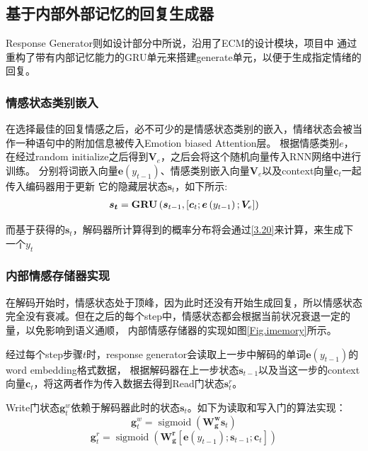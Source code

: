 \documentclass[supercite]{HustGraduPaper}
\theoremstyle{definition}
\begin{document}
\subsection{基于内部外部记忆的回复生成器}
Response Generator则如设计部分中所说，沿用了ECM\cite{DBLP:journals/corr/ZhouHZZL17}的设计模块，项目中
通过重构了带有内部记忆能力的GRU单元来搭建generate单元，以便于生成指定情绪的回复。

\subsubsection{情感状态类别嵌入}
在选择最佳的回复情感之后，必不可少的是情感状态类别的嵌入，情绪状态会被当作一种语句中的附加信息被传入Emotion biased Attention层。
根据情感类别$e$，在经过random initialize之后得到$\boldsymbol{V}_e$，之后会将这个随机向量传入RNN网络中进行训练。
分别将词嵌入向量$\boldsymbol{e}(y_{t-1})$、情感类别嵌入向量$\boldsymbol{V}_e$以及context向量$\boldsymbol{c}_t$一起传入编码器用于更新
它的隐藏层状态$\boldsymbol{s}_t$，如下所示:
\begin{align}
  \boldsymbol { s } _ { \boldsymbol { t } } = \mathbf { G } \mathbf { R } \mathbf { U } \left( \boldsymbol { s } _ { t - 1 } , \left[ \boldsymbol { c } _ { t } ; \boldsymbol { e } \left( y _ { t - 1 } \right) ; \boldsymbol { V } _ { e } \right] \right) \notag
\end{align}

而基于获得的$\boldsymbol{s}_t$，解码器所计算得到的概率分布将会通过\ref{3.20}来计算，来生成下一个$y_t$

\subsubsection{内部情感存储器实现}
在解码开始时，情感状态处于顶峰，因为此时还没有开始生成回复，所以情感状态完全没有衰减。但在之后的每个step中，情感状态都会根据当前状况衰退一定的量，以免影响到语义通顺，
内部情感存储器的实现如图\ref{Fig.imemory}所示。

经过每个step步骤$t$时，response generator会读取上一步中解码的单词$\boldsymbol{e}(y_{t-1})$的word embedding格式数据，
根据解码器在上一步状态$\boldsymbol{s}_{t-1}$以及当这一步的context向量$\boldsymbol{c}_t$，将这两者作为传入数据去得到Read门状态${\boldsymbol{s}_t^r}$。

Write门状态$\boldsymbol{g}_t^w$依赖于解码器此时的状态$\boldsymbol{s}_t$。如下为读取和写入门的算法实现：
$$\boldsymbol { g } _ { t } ^ { w } = \operatorname { sigmoid } \left( \mathbf { W } _ { \mathbf { g } } ^ { \mathbf { w } } \boldsymbol { s } _ { t } \right)$$
$$\boldsymbol { g } _ { t } ^ { r } = \operatorname { sigmoid } \left( \mathbf { W } _ { \mathbf { g } } ^ { \mathbf { r } } \left[ \boldsymbol { e } \left( y _ { t - 1 } \right) ; \boldsymbol { s } _ { t - 1 } ; \boldsymbol { c } _ { t } \right] \right)$$
\end{document}
